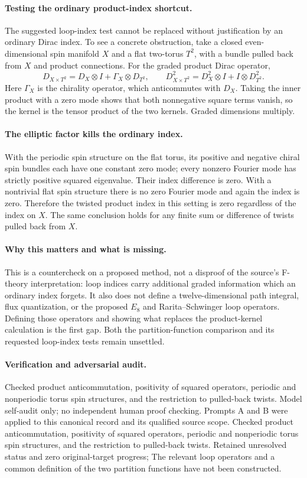 \documentclass[11pt]{article}
\begin{document}
\paragraph{Testing the ordinary product-index shortcut.} The suggested loop-index test cannot be replaced without justification by an ordinary Dirac index. To see a concrete obstruction, take a closed even-dimensional spin manifold $X$ and a flat two-torus $T^2$, with a bundle pulled back from $X$ and product connections. For the graded product Dirac operator,
\[
 D_{X\times T^2}=D_X\otimes I+\Gamma_X\otimes D_{T^2},\qquad
 D_{X\times T^2}^2=D_X^2\otimes I+I\otimes D_{T^2}^2.
\]
Here $\Gamma_X$ is the chirality operator, which anticommutes with $D_X$. Taking the inner product with a zero mode shows that both nonnegative square terms vanish, so the kernel is the tensor product of the two kernels. Graded dimensions multiply.

\paragraph{The elliptic factor kills the ordinary index.} With the periodic spin structure on the flat torus, its positive and negative chiral spin bundles each have one constant zero mode; every nonzero Fourier mode has strictly positive squared eigenvalue. Their index difference is zero. With a nontrivial flat spin structure there is no zero Fourier mode and again the index is zero. Therefore the twisted product index in this setting is zero regardless of the index on $X$. The same conclusion holds for any finite sum or difference of twists pulled back from $X$.

\paragraph{Why this matters and what is missing.} This is a countercheck on a proposed method, not a disproof of the source's F-theory interpretation: loop indices carry additional graded information which an ordinary index forgets. It also does not define a twelve-dimensional path integral, flux quantization, or the proposed $E_8$ and Rarita--Schwinger loop operators. Defining those operators and showing what replaces the product-kernel calculation is the first gap. Both the partition-function comparison and its requested loop-index tests remain unsettled.

\paragraph{Verification and adversarial audit.}
Checked product anticommutation, positivity of squared operators, periodic and nonperiodic torus spin structures, and the restriction to pulled-back twists. Model self-audit only; no independent human proof checking. Prompts A and B were applied to this canonical record and its qualified source scope. Checked product anticommutation, positivity of squared operators, periodic and nonperiodic torus spin structures, and the restriction to pulled-back twists. Retained unresolved status and zero original-target progress; The relevant loop operators and a common definition of the two partition functions have not been constructed.
\end{document}
